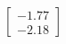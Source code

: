 \documentclass[preview]{standalone}
\begin{document}
\begin{align*}
\begin{bmatrix} -1.77 \\ -2.18 \end{bmatrix}
\end{align*}
\end{document}
